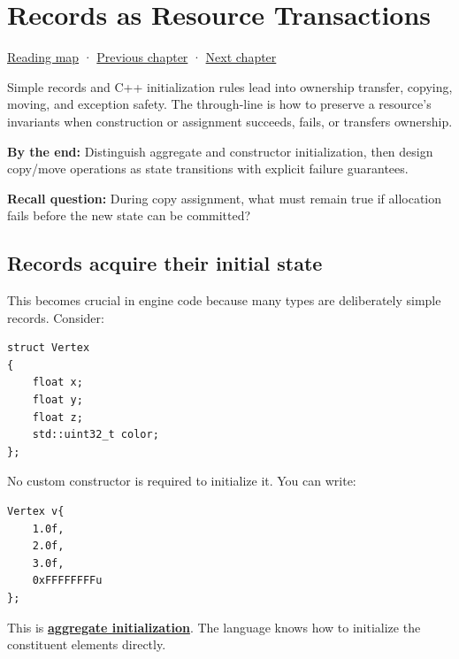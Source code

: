 \chapter{Records as Resource Transactions}\label{01-foundations-i-ch003-records-as-resource-transactions}\hypertarget{01-foundations-i-ch003}{}\label{stagechapter:01-foundations-i-ch003}

\hypertarget{01-foundations-i-ch003-records-as-resource-transactions}{}

\hyperref[volume-reading-map]{Reading map} · \hyperref[01-foundations-i-ch002-values-at-addresses-layout-lifetimes-and-representation]{Previous chapter} · \hyperref[01-foundations-i-ch004-prove-c-ownership-with-runnable-experiments]{Next chapter}

Simple records and C++ initialization rules lead into ownership transfer, copying, moving, and exception safety. The through-line is how to preserve a resource's invariants when construction or assignment succeeds, fails, or transfers ownership.

\textbf{By the end:} Distinguish aggregate and constructor initialization, then design copy/move operations as state transitions with explicit failure guarantees.

\textbf{Recall question:} During copy assignment, what must remain true if allocation fails before the new state can be committed?

\section{Records acquire their initial state}\label{01-foundations-i-ch003-records-acquire-their-initial-state}

\hypertarget{01-foundations-i-ch003-records-acquire-their-initial-state}{}

This becomes crucial in engine code because many types are deliberately simple records. Consider:

\begin{verbatim}
struct Vertex
{
    float x;
    float y;
    float z;
    std::uint32_t color;
};
\end{verbatim}

No custom constructor is required to initialize it. You can write:

\begin{verbatim}
Vertex v{
    1.0f,
    2.0f,
    3.0f,
    0xFFFFFFFFu
};
\end{verbatim}

This is \textbf{\hyperref[appendix-b7174c179542]{aggregate initialization}}. The language knows how to initialize the constituent elements directly.

